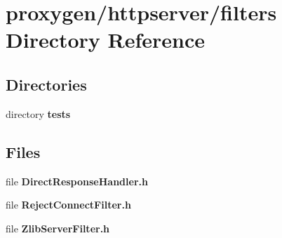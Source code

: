 \section{proxygen/httpserver/filters Directory Reference}
\label{dir_8de93ba9c6e16626b7b00f6aaa48f076}
\subsection*{Directories}
\begin{DoxyCompactItemize}
\item 
directory {\bf tests}
\end{DoxyCompactItemize}
\subsection*{Files}
\begin{DoxyCompactItemize}
\item 
file {\bf Direct\+Response\+Handler.\+h}
\item 
file {\bf Reject\+Connect\+Filter.\+h}
\item 
file {\bf Zlib\+Server\+Filter.\+h}
\end{DoxyCompactItemize}
